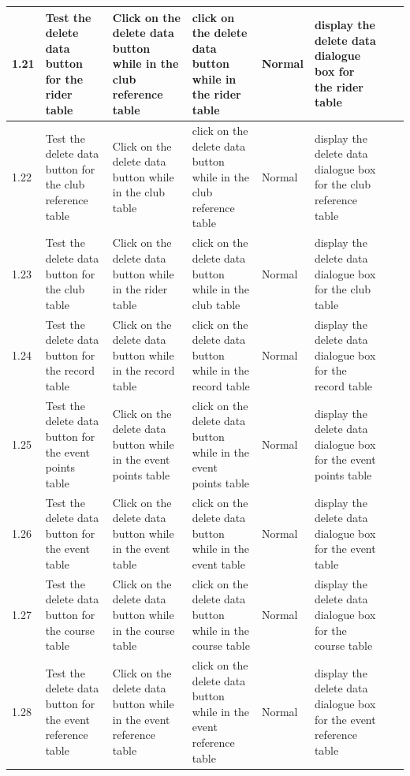 \begin{landscape}
\begin{center}
\begin{longtable}{|p{1.5cm}|p{2.5cm}|p{2.5cm}|p{2cm}|p{2cm}|p{2cm}|p{2cm}|p{2cm}|}
        1.21 & Test the delete data button for the rider table & Click on the delete data button while in the club reference table & click on the delete data button while in the rider table & Normal & display the delete data dialogue box for the rider table & & \\ \hline
        1.22 & Test the delete data button for the club reference table & Click on the delete data button while in the club table & click on the delete data button while in the club reference table & Normal & display the delete data dialogue box for the club reference table & & \\ \hline
        1.23 & Test the delete data button for the club  table & Click on the delete data button while in the rider table & click on the delete data button while in the club table & Normal & display the delete data dialogue box for the club  table & & \\ \hline
        \rowcolor{DarkGrey}1.24 & Test the delete data button for the record  table & Click on the delete data button while in the record table & click on the delete data button while in the record table & Normal & display the delete data dialogue box for the record  table & & \\ \hline
        \rowcolor{DarkGrey}1.25 & Test the delete data button for the event points  table & Click on the delete data button while in the event points table & click on the delete data button while in the event points table & Normal & display the delete data dialogue box for the event points  table & & \\ \hline
        \rowcolor{DarkGrey}1.26 & Test the delete data button for the event  table & Click on the delete data button while in the event table & click on the delete data button while in the event table & Normal & display the delete data dialogue box for the event  table & & \\ \hline
        \rowcolor{DarkGrey}1.27 & Test the delete data button for the course  table & Click on the delete data button while in the course table & click on the delete data button while in the course table & Normal & display the delete data dialogue box for the course  table & & \\ \hline
        \rowcolor{DarkGrey}1.28 & Test the delete data button for the event reference  table & Click on the delete data button while in the event reference table & click on the delete data button while in the event reference table & Normal & display the delete data dialogue box for the event reference  table & & \\ \hline

\end{longtable}
\end{center}
\end{landscape}
